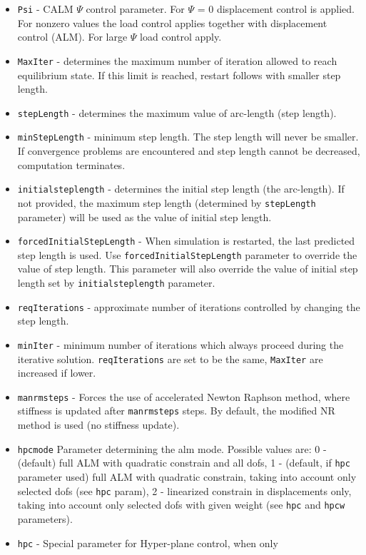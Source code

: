 \documentclass[a4paper]{article}
\newcommand{\param}[1]{\texttt{#1}} %
\begin{document}
\begin{itemize}
\item \param{Psi} - CALM $\Psi$ control parameter. For $\Psi$ = 0
displacement control is applied. For nonzero values the load control
applies together with displacement control (ALM). For large $\Psi$
load control apply.
\item \param{MaxIter} - determines the maximum number of iteration allowed to
reach equilibrium state. If this limit is reached, restart follows
with smaller step length.
\item \param{stepLength} - determines the maximum value of arc-length (step length).
\item \param{min\-Step\-Le\-ngth} - minimum step length. The step length will never be
smaller. If convergence problems are encountered and step length cannot
be decreased, computation terminates.
\item \param{initialsteplength} - determines the initial step length (the arc-length). If not provided, the maximum step length (determined by \param{stepLength} parameter) will be used as the value of initial step length. 
\item \param{forcedInitialStepLength} - When simulation is restarted, the last predicted step length is used. Use \param{forcedInitialStepLength} parameter to override the value of step length. This parameter will also override the value of initial step length set by \param{initialsteplength} parameter.
\item \param{reqIterations} - approximate number of iterations controlled by changing the step length.
\item \param{minIter} - minimum number of iterations which always proceed during the iterative solution. \param{reqIterations} are set to be the same, \param{MaxIter} are increased if lower.
\item \param{manrmsteps} - Forces the use of accelerated
Newton Raphson met\-hod, where stiffness is updated after
\param{manrmsteps} steps. By default, the modified NR
method is used (no stiffness update).
\item \param{hpcmode} Parameter determining the alm mode.
Possible values are: 0 - (default) full ALM with quadratic constrain and
all dofs, 1 - (default, if \param{hpc} parameter used) full ALM with quadratic constrain, taking into account
only selected dofs (see \param{hpc} param), 2 - linearized constrain
in displacements only, taking into account only selected dofs with
given weight (see \param{hpc} and \param{hpcw} parameters).
\item \param{hpc} - Special parameter for Hyper-plane control, when only

\end{itemize}
\end{document}
